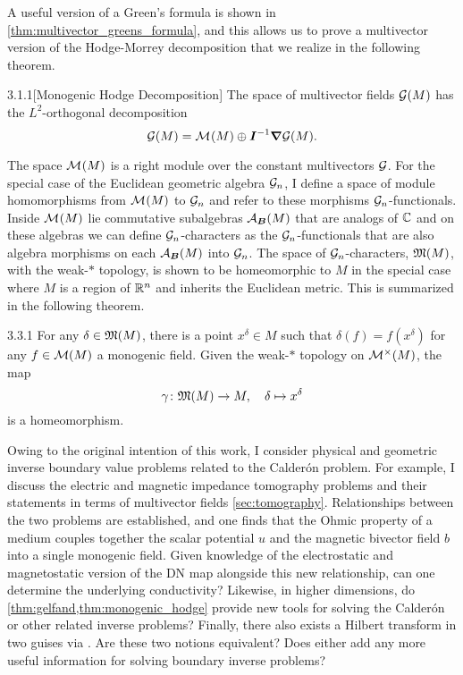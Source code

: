 A useful version of a Green's formula is shown in \cref{thm:multivector_greens_formula}, and this allows us to prove a multivector version of the Hodge-Morrey decomposition that we realize in the following theorem.
\begin{customthm}{3.1.1}[Monogenic Hodge Decomposition]
The space of multivector fields $\mathcal{G}(M)$ has the $L^2$-orthogonal decomposition
\begin{equation}
\mathcal{G}(M) = \mathcal{M}^{}(M) \oplus \boldsymbol{I}^{-1} \boldsymbol{\nabla} \mathcal{G}(M).
\end{equation}
\end{customthm}

The space $\mathcal{M}^{}(M)$ is a right module over the constant multivectors $\mathcal{G}$. For the special case of the Euclidean geometric algebra $\mathcal{G}_n$, I define a space of module homomorphisms from $\mathcal{M}^{}(M)$ to $\mathcal{G}_n$ and refer to these morphisms $\mathcal{G}_n$-functionals. Inside $\mathcal{M}^{}(M)$ lie commutative subalgebras $\mathcal{A}_{\boldsymbol{B}}(M)$ that are analogs of $\mathbb{C}$ and on these algebras we can define $\mathcal{G}_n$-characters as the $\mathcal{G}_n$-functionals that are also algebra morphisms on each $\mathcal{A}_{\boldsymbol{B}}(M)$ into $\mathcal{G}_n$. The space of $\mathcal{G}_n$-characters, $\mathfrak{M}(M)$, with the weak-$\ast$ topology, is shown to be homeomorphic to $M$ in the special case where $M$ is a region of $\mathbb{R}^n$ and inherits the Euclidean metric. This is summarized in the following theorem.
\begin{customthm}{3.3.1}
For any $\delta \in \mathfrak{M}(M)$, there is a point $x^\delta \in M$ such that $\delta(f) = f(x^\delta)$ for any $f\in \mathcal{M}(M)$ a monogenic field. Given the weak-$\ast$ topology on $\mathcal{M}^\times(M)$, the map
\[
\gamma \colon \mathfrak{M}(M) \to M, \quad \delta \mapsto x^\delta
\]
is a homeomorphism. 
\end{customthm}

Owing to the original intention of this work, I consider physical and geometric inverse boundary value problems related to the Calder\'on problem. For example, I discuss the electric and magnetic impedance tomography problems and their statements in terms of multivector fields \cref{sec:tomography}. Relationships between the two problems are established, and one finds that the Ohmic property of a medium couples together the scalar potential $u$ and the magnetic bivector field $b$ into a single monogenic field. Given knowledge of the electrostatic and magnetostatic version of the DN map alongside this new relationship, can one determine the underlying conductivity? Likewise, in higher dimensions, do \cref{thm:gelfand,thm:monogenic_hodge} provide new tools for solving the Calder\'on or other related inverse problems? Finally, there also exists a Hilbert transform in two guises via \cite{belishev_dirichlet_2008,brackx_hilbert_2008}. Are these two notions equivalent? Does either add any more useful information for solving boundary inverse problems?